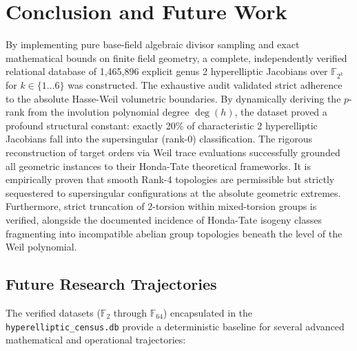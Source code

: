 \documentclass[11pt,letterpaper]{article}
\begin{document}
\section{Conclusion and Future Work}
By implementing pure base-field algebraic divisor sampling and exact mathematical bounds on finite field geometry, a complete, independently verified relational database of 1,465,896 explicit genus 2 hyperelliptic Jacobians over $\mathbb{F}_{2^k}$ for $k \in \{1 \dots 6\}$ was constructed. The exhaustive audit validated strict adherence to the absolute Hasse-Weil volumetric boundaries. By dynamically deriving the $p$-rank from the involution polynomial degree $\deg(h)$, the dataset proved a profound structural constant: exactly 20\% of characteristic 2 hyperelliptic Jacobians fall into the supersingular (rank-0) classification. The rigorous reconstruction of target orders via Weil trace evaluations successfully grounded all geometric instances to their Honda-Tate theoretical frameworks. It is empirically proven that smooth Rank-4 topologies are permissible but strictly sequestered to supersingular configurations at the absolute geometric extremes. Furthermore, strict truncation of 2-torsion within mixed-torsion groups is verified, alongside the documented incidence of Honda-Tate isogeny classes fragmenting into incompatible abelian group topologies beneath the level of the Weil polynomial. 

\subsection{Future Research Trajectories}
The verified datasets ($\mathbb{F}_2$ through $\mathbb{F}_{64}$) encapsulated in the \texttt{hyperelliptic\_census.db} provide a deterministic baseline for several advanced mathematical and operational trajectories:
\end{document}
